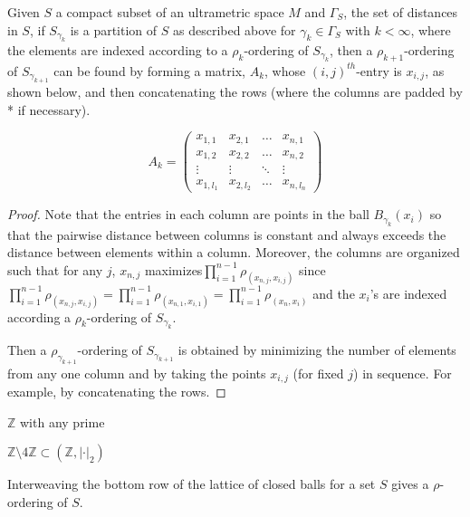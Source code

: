 \begin{proposition*}
Given $S$ a compact subset of an ultrametric space $M$ and $\Gamma_S$, the set of distances in $S$, if $S_{\gamma_k}$ is a partition of $S$ as described above for $\gamma_k \in \Gamma_S$ with $k < \infty$, where the elements are indexed according to a $\rho_k$-ordering of $S_{\gamma_k}$, then a $\rho_{k+1}$-ordering of $S_{\gamma_{k+1}}$ can be found by forming a matrix, $A_k$, whose $(i,j)^{th}$-entry is $x_{i,j}$, as shown below, and then concatenating the rows (where the columns are padded by * if necessary). 
\end{proposition*}

\[A_k=
 \begin{pmatrix}
  x_{1,1} & x_{2,1} & \ldots  &x_{n,1} \\
  x_{1,2} & x_{2,2} &\ldots &x_{n,2} \\
  \vdots & \vdots & \ddots & \vdots \\
  x_{1,l_1} & x_{2,l_2} & \ldots &x_{n,l_n}
 \end{pmatrix}
\]


\begin{proof}
Note that the entries in each column are points in the ball $B_{\gamma_k}(x_i)$ so that the pairwise distance between columns is constant and always exceeds the distance between elements within a column. Moreover, the columns are organized such that for any $j$, $x_{n,j}$ maximizes$\prod_{i=1}^{n-1} \rho_(x_{n,j},x_{i,j})$ since $\prod_{i=1}^{n-1} \rho_(x_{n,j},x_{i,j}) = \prod_{i=1}^{n-1} \rho_(x_{n,1},x_{i,1}) = \prod_{i=1}^{n-1} \rho_(x_{n},x_{i})$ and the $x_i$'s are indexed according a $\rho_k$-ordering of $S_{\gamma_k}$.

Then a $\rho_{\gamma_{k+1}}$-ordering of $S_{\gamma_{k+1}}$ is obtained by minimizing the number of elements from any one column and by taking the points $x_{i,j}$ (for fixed $j$) in sequence. For example, by concatenating the rows.
\end{proof}

\begin{example}
$\mathbb{Z}$ with any prime
\end{example}

\begin{example}
$\mathbb{Z} \setminus 4\mathbb{Z} \subset (\mathbb{Z}, \lvert \cdot \rvert_2)$
\end{example}


\begin{corollary*}
Interweaving the bottom row of the lattice of closed balls for a set $S$ gives a $\rho$-ordering of $S$. 
\end{corollary*}

